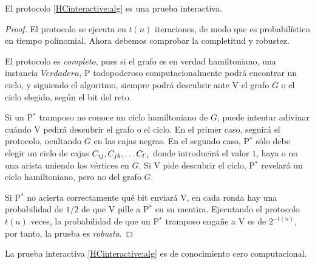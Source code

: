 \hfil

\begin{theorem}
	El protocolo \ref{HCinteractive:alg} es una prueba interactiva.
\end{theorem}

\begin{proof}
	El protocolo se ejecuta en $t(n)$ iteraciones, de modo que es probabilístico en tiempo polinomial. Ahora debemos comprobar la completitud y robustez.
	
	El protocolo es \textit{completo}, pues si el grafo es en verdad hamiltoniano, una instancia $Verdadera$, P todopoderoso computacionalmente podrá encontrar un ciclo, y siguiendo el algoritmo, siempre podrá descubrir ante V el grafo $G$ o el ciclo elegido, según el bit del reto.
	
	Si un P$^*$ tramposo no conoce un ciclo hamiltoniano de $G$, puede intentar adivinar cuándo V pedirá descubrir el grafo o el ciclo. En el primer caso, seguirá el protocolo, ocultando $G$ en las cajas negras. En el segundo caso, P$^*$ sólo debe elegir un ciclo de cajas  $C_{ij}, C_{jk}, \dots C_{l^`i}$ donde introducirá el valor $1$, haya o no una arista uniendo los vértices en $G$. Si V pide descubrir el ciclo, P$^*$ revelará un ciclo hamiltoniano, pero no del grafo $G$.
	
	Si P$^*$ no acierta correctamente qué bit enviará V, en cada ronda hay una probabilidad de $1/2$ de que V pille a P$^*$ en su mentira. Ejecutando el protocolo $t(n)$ veces, la probabilidad de que un P$^*$ tramposo engañe a V es de $2^{-t(n)}$, por tanto, la prueba es \textit{robusta}.
\end{proof}




\begin{theorem}
	La prueba interactiva \ref{HCinteractive:alg} es de conocimiento cero computacional.
\end{theorem}

